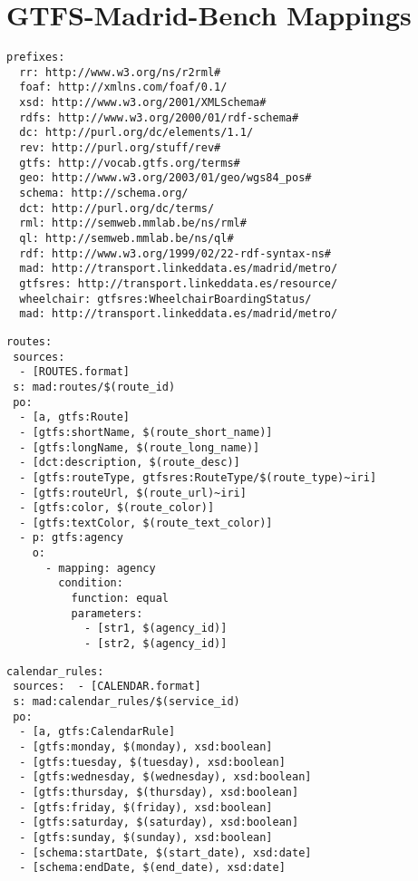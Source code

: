 \chapter{GTFS-Madrid-Bench Mappings}
\label{sec:appendix2}


\begin{lstlisting}[caption=Prefixes, label=lst:prefixes2, basicstyle=\small,frame=single]
prefixes:
  rr: http://www.w3.org/ns/r2rml#
  foaf: http://xmlns.com/foaf/0.1/
  xsd: http://www.w3.org/2001/XMLSchema#
  rdfs: http://www.w3.org/2000/01/rdf-schema#
  dc: http://purl.org/dc/elements/1.1/
  rev: http://purl.org/stuff/rev#
  gtfs: http://vocab.gtfs.org/terms#
  geo: http://www.w3.org/2003/01/geo/wgs84_pos#
  schema: http://schema.org/
  dct: http://purl.org/dc/terms/
  rml: http://semweb.mmlab.be/ns/rml#
  ql: http://semweb.mmlab.be/ns/ql#
  rdf: http://www.w3.org/1999/02/22-rdf-syntax-ns#
  mad: http://transport.linkeddata.es/madrid/metro/
  gtfsres: http://transport.linkeddata.es/resource/
  wheelchair: gtfsres:WheelchairBoardingStatus/
  mad: http://transport.linkeddata.es/madrid/metro/

\end{lstlisting}
\begin{lstlisting}[caption=Routes TripleMap, label=lst:routes, basicstyle=\small,frame=single]
routes:
 sources:
  - [ROUTES.format]
 s: mad:routes/$(route_id)
 po:
  - [a, gtfs:Route]
  - [gtfs:shortName, $(route_short_name)]
  - [gtfs:longName, $(route_long_name)]
  - [dct:description, $(route_desc)]
  - [gtfs:routeType, gtfsres:RouteType/$(route_type)~iri]
  - [gtfs:routeUrl, $(route_url)~iri]
  - [gtfs:color, $(route_color)]
  - [gtfs:textColor, $(route_text_color)]
  - p: gtfs:agency
    o:
      - mapping: agency
        condition:
          function: equal
          parameters:
            - [str1, $(agency_id)]
            - [str2, $(agency_id)]
\end{lstlisting}
\begin{lstlisting}[caption=Calendar\_Date TripleMap, label=lst:calendarDate, basicstyle=\small,frame=single]
calendar_rules:
 sources:  - [CALENDAR.format]
 s: mad:calendar_rules/$(service_id)
 po:
  - [a, gtfs:CalendarRule]
  - [gtfs:monday, $(monday), xsd:boolean]
  - [gtfs:tuesday, $(tuesday), xsd:boolean]
  - [gtfs:wednesday, $(wednesday), xsd:boolean]
  - [gtfs:thursday, $(thursday), xsd:boolean]
  - [gtfs:friday, $(friday), xsd:boolean]
  - [gtfs:saturday, $(saturday), xsd:boolean]
  - [gtfs:sunday, $(sunday), xsd:boolean]
  - [schema:startDate, $(start_date), xsd:date]
  - [schema:endDate, $(end_date), xsd:date]
\end{lstlisting}

